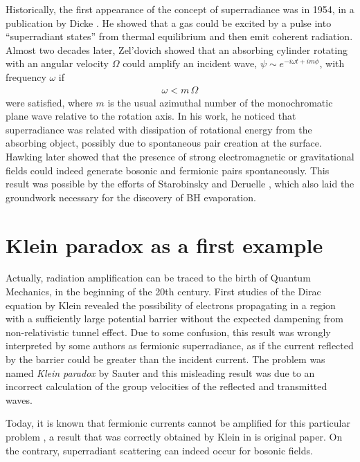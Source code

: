 Historically, the first appearance of the concept of superradiance was in 1954, in a publication by Dicke \cite{Dicke1954}.
He showed that a gas could be excited by a pulse into ``superradiant states'' from thermal equilibrium and then emit coherent radiation.
Almost two decades later, Zel'dovich \cite{Zeldovich1971,Zeldovich1972} showed that an absorbing cylinder rotating with an angular velocity $\Omega$ could amplify an incident wave, $\psi \sim e^{-i \omega t + i m \phi}$, with frequency $\omega$ if
\begin{align}
    \omega < m\, \Omega
    \label{eq1:superradiance}
\end{align}
were satisfied, where $m$ is the usual azimuthal number of the monochromatic plane wave relative to the rotation axis.
In his work, he noticed that superradiance was related with dissipation of rotational energy from the absorbing object, possibly due to spontaneous pair creation at the surface. 
Hawking later showed that the presence of strong electromagnetic or gravitational fields could indeed generate bosonic and fermionic pairs spontaneously.
This result was possible by the efforts of Starobinsky and Deruelle \cite{Starobinsky1973a,Starobinsky1973b,Deruelle1974,Deruelle1975}, which also laid the groundwork necessary for the discovery of BH evaporation.


\section{Klein paradox as a first example}

Actually, radiation amplification can be traced to the birth of Quantum Mechanics, in the beginning of the 20th century. 
First studies of the Dirac equation by Klein \cite{Klein1929} revealed the possibility of electrons propagating in a region with a sufficiently large potential barrier without the expected dampening from non-relativistic tunnel effect.
Due to some confusion, this result was wrongly interpreted by some authors as fermionic superradiance, as if the current reflected by the barrier could be greater than the incident current. 
The problem was named \emph{Klein paradox} by Sauter \cite{Sauter1931} and this misleading result was due to an incorrect calculation of the group velocities of the reflected and transmitted waves. 

Today, it is known that fermionic currents cannot be amplified for this particular problem \cite{Manogue1988,Klein1929}, a result that was correctly obtained by Klein in is original paper. 
On the contrary, superradiant scattering can indeed occur for bosonic fields.

